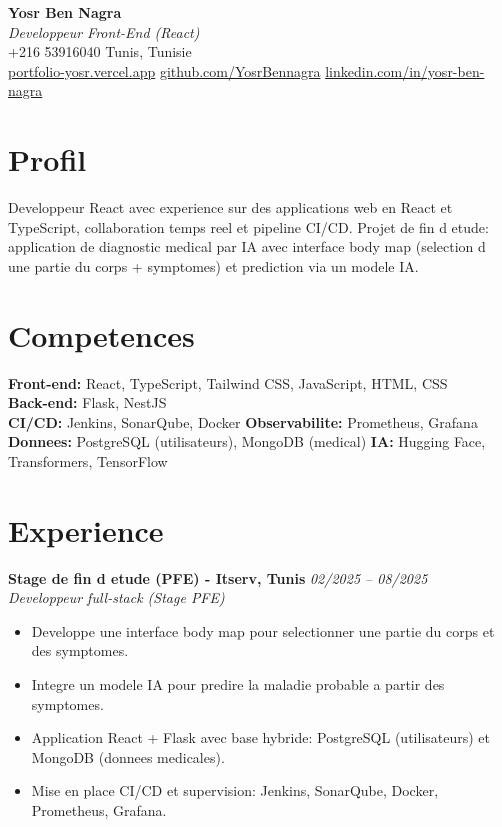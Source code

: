 \documentclass[9pt,a4paper]{article}
\begin{document}
\begin{center}
  {\LARGE\textbf{Yosr Ben Nagra}}\\
  \vspace{2pt}
  \textit{Developpeur Front-End (React)}\\
  \vspace{4pt}
  +216 53916040 \textbar{} Tunis, Tunisie\\
  {\small
  \href{https://portfolio-yosr.vercel.app/en}{portfolio-yosr.vercel.app} \textbar{}
  \href{https://github.com/YosrBennagra}{github.com/YosrBennagra} \textbar{}
  \href{https://www.linkedin.com/in/yosr-ben-nagra/}{linkedin.com/in/yosr-ben-nagra}
  }
\end{center}

\vspace{-4pt}
\section*{Profil}
Developpeur React avec experience sur des applications web en React et TypeScript, collaboration temps reel et pipeline CI/CD. Projet de fin d etude: application de diagnostic medical par IA avec interface body map (selection d une partie du corps + symptomes) et prediction via un modele IA.

\section*{Competences}
\textbf{Front-end:} React, TypeScript, Tailwind CSS, JavaScript, HTML, CSS\\
\textbf{Back-end:} Flask, NestJS\\
\textbf{CI/CD:} Jenkins, SonarQube, Docker \textbar{} \textbf{Observabilite:} Prometheus, Grafana\\
\textbf{Donnees:} PostgreSQL (utilisateurs), MongoDB (medical) \textbar{} \textbf{IA:} Hugging Face, Transformers, TensorFlow

\section*{Experience}
\textbf{Stage de fin d etude (PFE) - Itserv, Tunis} \hfill \textit{02/2025 -- 08/2025}\\
\textit{Developpeur full-stack (Stage PFE)}
\begin{itemize}
  \item Developpe une interface body map pour selectionner une partie du corps et des symptomes.
  \item Integre un modele IA pour predire la maladie probable a partir des symptomes.
  \item Application React + Flask avec base hybride: PostgreSQL (utilisateurs) et MongoDB (donnees medicales).
  \item Mise en place CI/CD et supervision: Jenkins, SonarQube, Docker, Prometheus, Grafana.
\end{itemize}
\end{document}
